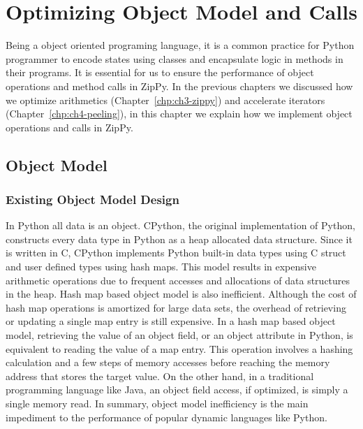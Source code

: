 \chapter{Optimizing Object Model and Calls}
\label{chp:ch5-object}

Being a object oriented programing language, it is a common practice for Python programmer to encode states using classes and encapsulate logic in methods in their programs.
It is essential for us to ensure the performance of object operations and method calls in ZipPy.
In the previous chapters we discussed how we optimize arithmetics (Chapter~\ref{chp:ch3-zippy}) and accelerate iterators (Chapter~\ref{chp:ch4-peeling}),
in this chapter we explain how we implement object operations and calls in ZipPy.

\section{Object Model}
\label{sec:ch5-object-module}

\subsection{Existing Object Model Design}

In Python all data is an object.
CPython, the original implementation of Python, constructs every data type in Python as a heap allocated data structure.
Since it is written in C, CPython implements Python built-in data types using C struct and user defined types using hash maps.
This model results in expensive arithmetic operations due to frequent accesses and allocations of data structures in the heap.
Hash map based object model is also inefficient.
Although the cost of hash map operations is amortized for large data sets, the overhead of retrieving or updating a single map entry is still expensive.
In a hash map based object model, retrieving the value of an object field, or an object attribute in Python, is equivalent to reading the value of a map entry.
This operation involves a hashing calculation and a few steps of memory accesses before reaching the memory address that stores the target value.
On the other hand, in a traditional programming language like Java, an object field access, if optimized, is simply a single memory read.
In summary, object model inefficiency is the main impediment to the performance of popular dynamic languages like Python.

